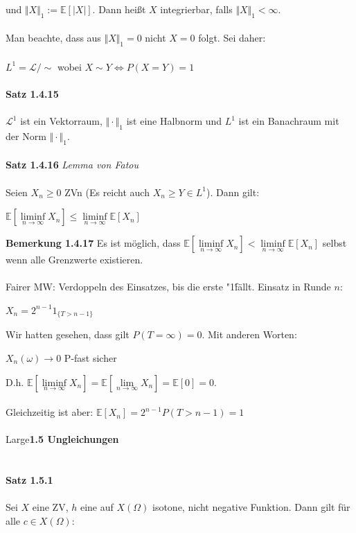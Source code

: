 \documentclass[10pt,a4paper]{report}
\numberwithin{equation}{section}
\numberwithin{figure}{section}
\theoremstyle{plain}
\theoremstyle{definition}
\theoremstyle{plain}
\theoremstyle{definition}
\theoremstyle{remark}
\theoremstyle{plain}
\begin{document}
und $\Vert X\Vert_1:=\mathbb{E}[|X|]$. Dann heißt $X$ integrierbar, falls $\Vert X \Vert_1 < \infty$.\\\\
Man beachte, dass aus $\Vert X \Vert_1=0$ nicht $X=0$ folgt. Sei daher:\\\\
$L^1=\mathcal{L}/\sim$ wobei $X\sim Y \Leftrightarrow P(X=Y)=1$\\\\
\textbf{Satz 1.4.15}\\\\
$\mathcal{L}^1$ ist ein Vektorraum, $\Vert \cdot \Vert_1$ ist eine Halbnorm und $L^1$ ist ein Banachraum mit der Norm $\Vert \cdot \Vert_1$.\\\\
\textbf{Satz 1.4.16} \textit{Lemma von Fatou}\\\\
Seien $X_n\geq 0$ ZVn (Es reicht auch $X_n \geq Y \in L^1$). Dann gilt:
\begin{center}
$\mathbb{E}[\liminf\limits_{n \to \infty} X_n]\leq \liminf\limits_{n \to \infty} \mathbb{E}[X_n]$
\end{center}
\textbf{Bemerkung 1.4.17}
Es ist möglich, dass $\mathbb{E}[\liminf\limits_{n \to \infty} X_n] < \liminf\limits_{n \to \infty} \mathbb{E}[X_n]$ selbst wenn alle Grenzwerte existieren.\\\\
Fairer MW: Verdoppeln des Einsatzes, bis die erste "1\' fällt. Einsatz in Runde $n$:
\begin{center}
$X_n=2^{n-1}1_{\{T>n-1\}}$
\end{center}
Wir hatten gesehen, dass gilt $P(T=\infty)=0$. Mit anderen Worten:
\begin{center}
$X_n(\omega) \to 0$ P-fast sicher
\end{center}
D.h. $\mathbb{E}[\liminf\limits_{n \to \infty} X_n]=\mathbb{E}[\lim\limits_{n \to \infty} X_n]=\mathbb{E}[0]=0$.\\\\
Gleichzeitig ist aber: $\mathbb{E}[X_n]=2^{n-1}P(T>n-1)=1$\\\\
Large{\textbf{1.5 Ungleichungen}}\normalsize\\\\\\
\textbf{Satz 1.5.1}\\\\
Sei $X$ eine ZV, $h$ eine auf $X(\Omega)$ isotone, nicht negative Funktion. Dann gilt für alle $c \in X(\Omega)$:
\end{document}
